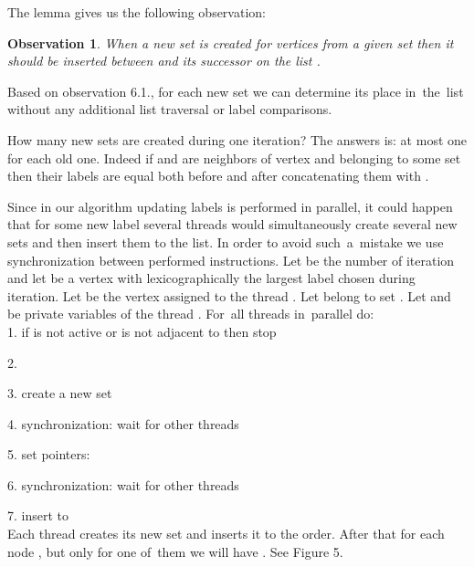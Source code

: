 \documentclass[a4paper, 11pt]{article}
\newtheorem{obs}[tw]{Observation}
\begin{document}
The lemma gives us the following observation:

\begin{obs}
When a new set is created for vertices from a given set  then it should be inserted between 
and its successor on the list . 
\end{obs}

Based on observation 6.1., for each new set we can determine its place in~the~list without 
any additional list traversal or label comparisons. 

How many new sets are created during one iteration? The answers is: at most one for each old one.
Indeed if  and  are neighbors of  vertex and belonging to some set  then their
labels are equal both before and after concatenating them with .

Since in our algorithm updating labels is performed in parallel, it could happen that for some 
new label several threads would simultaneously create several new sets and then insert them to 
the list. In order to avoid such~a~mistake we use synchronization between performed instructions.
\newpage
Let  be the number of iteration and let  be a vertex with lexicographically the largest 
label chosen during  iteration. Let  be the vertex assigned to the thread . Let  
belong to set . Let  and~ be private variables of the thread . 
For~all threads  in~parallel do:\\

\hspace{0.75cm} 1. if  is not active or  is not adjacent to  then stop

\hspace{0.75cm} 2. 

\hspace{0.75cm} 3. create a new set 

\hspace{0.75cm} 4. synchronization: wait for other threads

\hspace{0.75cm} 5. set pointers: 

\hspace{1.4cm}      

\hspace{1.4cm}      

\hspace{0.75cm} 6. synchronization: wait for other threads

\hspace{0.75cm} 7. insert  to \\

Each thread creates its new set  and inserts it to the order. After that for each 
node ,  but only for one of~them we will have . 
See Figure 5.
\end{document}
